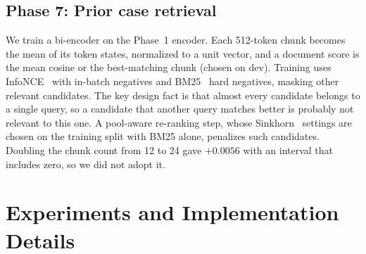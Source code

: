 \documentclass[10pt,a4paper]{article}
\begin{document}
\subsection{Phase 7: Prior case retrieval}\label{sec:p7}
We train a bi-encoder on the Phase~1 encoder. Each 512-token chunk becomes the mean of its token states, normalized to a unit vector, and a document score is the mean cosine or the best-matching chunk (chosen on dev). Training uses InfoNCE~\cite{infonce} with in-batch negatives and BM25~\cite{bm25} hard negatives, masking other relevant candidates. The key design fact is that almost every candidate belongs to a single query, so a candidate that another query matches better is probably not relevant to this one. A pool-aware re-ranking step, whose Sinkhorn~\cite{sinkhorn} settings are chosen on the training split with BM25 alone, penalizes such candidates. Doubling the chunk count from 12 to 24 gave $+0.0056$ with an interval that includes zero, so we did not adopt it.

\section{Experiments and Implementation Details}
\end{document}
